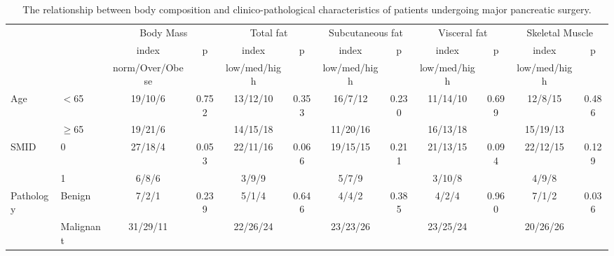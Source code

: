 \begin{sidewaystable}[p]
	\tiny
	\caption{The relationship between body composition and clinico-pathological characteristics of patients undergoing major pancreatic surgery.}
	\label{table:bc_clinical_donny}
	\renewcommand{\arraystretch}{2.0} %
	\setlength{\tabcolsep}{9pt} %
	\centering
	\begin{tabular}{|l l| c c | c c| c c | c c |c c |}
		\hline
		                    &           & \multicolumn{2}{c|}{Body Mass} & \multicolumn{2}{c|}{Total fat} & \multicolumn{2}{c|}{Subcutaneous fat } & \multicolumn{2}{c|}{Visceral fat} & \multicolumn{2}{c|}{Skeletal Muscle} \\
		                    &           & index           & p           & index        & p              & index        & p                      & index        & p                 & index        & p                    \\
		                    &           & norm/Over/Obese &             & low/med/high &                & low/med/high &                        & low/med/high &                   & low/med/high &  \\
		Age                 & $<$65     & 19/10/6         & 0.752       & 13/12/10     & 0.353          & 16/7/12      & 0.230                  & 11/14/10     & 0.699             & 12/8/15      & 0.486                \\
		                    & $\geq$65  & 19/21/6         &             & 14/15/18     &                & 11/20/16     &                        & 16/13/18     &                   & 15/19/13     &  \\ \hline
		SMID                & 0         & 27/18/4         & 0.053       & 22/11/16     & 0.066          & 19/15/15     & 0.211                  & 21/13/15     & 0.094             & 22/12/15     & 0.129                \\
		                    & 1         & 6/8/6           &             & 3/9/9        &                & 5/7/9        &                        & 3/10/8       &                   & 4/9/8        &  \\ \hline
		Pathology           & Benign    & 7/2/1           & 0.239       & 5/1/4        & 0.646          & 4/4/2        & 0.385                  & 4/2/4        & 0.960             & 7/1/2        & 0.036                \\
		                    & Malignant & 31/29/11        &             & 22/26/24     &                & 23/23/26     &                        & 23/25/24     &                   & 20/26/26     &  \\ \hline

\end{tabular}
\end{sidewaystable}
